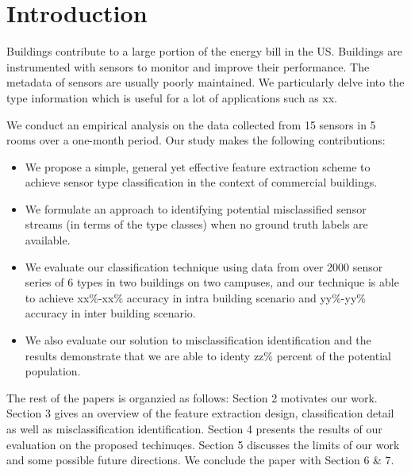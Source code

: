 \section{Introduction}
Buildings contribute to a large portion of the energy bill in the US.
Buildings are instrumented with sensors to monitor and improve their performance.
The metadata of sensors are usually poorly maintained. We particularly delve into the type information which is useful for a lot of applications such as xx.

We conduct an empirical analysis on the data collected from 15 sensors in 5 rooms over a one-month period.  Our study makes the following contributions:

\begin{itemize}
\item We propose a simple, general yet effective feature extraction scheme to achieve sensor type classification in the context of commercial buildings.
\item We formulate an approach to identifying potential misclassified sensor streams (in terms of the type classes) when no ground truth labels are available.
\item We evaluate our classification technique using data from over 2000 sensor series of 6 types in two buildings on two campuses, and our technique is able to achieve xx\%-xx\% accuracy in intra building scenario and yy\%-yy\% accuracy in inter building scenario.
\item We also evaluate our solution to misclassification identification and the results demonstrate that we are able to identy zz\% percent of the potential population.
\end{itemize}

The rest of the papers is organzied as follows: Section 2 motivates our work. Section 3 gives an overview of the feature extraction design, classification detail as well as misclassification identification. Section 4 presents the results of our evaluation on the proposed techinuqes. Section 5 discusses the limits of our work and some possible future directions. We conclude the paper with Section 6 \& 7.